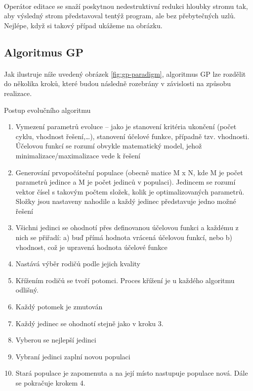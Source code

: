 \documentclass[bc,male,java,dept460]{diploma}		%
\begin{document}
\paragraph*{}
Operátor editace se snaží poskytnou nedestruktivní redukci hloubky stromu tak, aby výsledný strom představoval tentýž program, ale bez přebytečných uzlů. Nejlépe, když si takový případ ukážeme na obrázku.


\subsection{Algoritmus GP}
\paragraph*{}
Jak ilustruje níže uvedený obrázek \ref{fig:gp-paradigm}, algoritmus GP lze rozdělit do několika kroků, které budou následně rozebrány v závislosti na způsobu realizace.

\begin{example}
\label{priklad}
Postup evolučního algoritmu
\begin{enumerate}
\item Vymezení parametrů evoluce – jako je stanovení kritéria ukončení (počet cyklu, vhodnost řešení,…), stanovení účelové funkce, případně tzv. vhodnosti. Účelovou funkcí se rozumí obvykle matematický model, jehož minimalizace/maximalizace vede k řešení
\item Generování prvopočáteční populace (obecně matice M x N, kde M je počet parametrů jedince a M je počet jedinců v populaci). Jedincem se rozumí vektor čísel s takovým počtem složek, kolik je optimalizovaných parametrů. Složky jsou nastaveny nahodile a každý jedinec představuje jedno možné řešení
\item Všichni jedinci se ohodnotí přes definovanou účelovou funkci a každému z nich se přiřadí: a) buď přímá hodnota vrácená účelovou funkcí, nebo b) vhodnost, což je upravená hodnota účelové funkce
\item Nastává výběr rodičů podle jejich kvality
\item Křížením rodičů se tvoří potomci. Proces křížení je u každého algoritmu odlišný.
\item Každý potomek je zmutován
\item Každý jedinec se ohodnotí stejně jako v kroku 3.
\item Vyberou se nejlepší jedinci
\item Vybraní jedinci zaplní novou populaci
\item Stará populace je zapomenuta a na její místo nastupuje populace nová. Dále se pokračuje krokem 4.
\end{enumerate}
\end{example}
\end{document}
